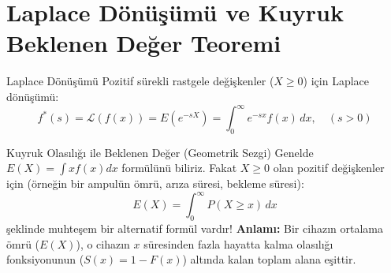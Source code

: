 \documentclass[12pt,a4paper]{article}
\begin{document}
\begin{center}
\end{center}

\vspace{0.5em}
\section{Laplace Dönüşümü ve Kuyruk Beklenen Değer Teoremi}

\begin{tanim}{Laplace Dönüşümü}
Pozitif sürekli rastgele değişkenler ($X \ge 0$) için Laplace dönüşümü:
\begin{equation}
    f^*(s) = \mathcal{L}(f(x)) = E(e^{-sX}) = \int_{0}^{\infty} e^{-sx} f(x) \, dx, \quad (s > 0)
\end{equation}
\end{tanim}

\begin{sezgi}{Kuyruk Olasılığı ile Beklenen Değer (Geometrik Sezgi)}
Genelde $E(X) = \int x f(x) dx$ formülünü biliriz. Fakat $X \ge 0$ olan pozitif değişkenler için (örneğin bir ampulün ömrü, arıza süresi, bekleme süresi):
\begin{equation}
    E(X) = \int_{0}^{\infty} P(X \ge x) \, dx
\end{equation}
şeklinde muhteşem bir alternatif formül vardır!  
\textbf{Anlamı:} Bir cihazın ortalama ömrü ($E(X)$), o cihazın $x$ süresinden fazla hayatta kalma olasılığı fonksiyonunun ($S(x) = 1 - F(x)$) altında kalan toplam alana eşittir.
\end{sezgi}
\end{document}
